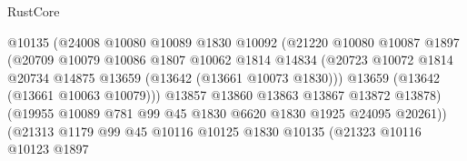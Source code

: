 \begin{lexlean}{RustCore}
\begin{coremodule}
                                    @10135
                                    (@24008
                                      @10080
                                      @10089
                                      @1830
                                      @10092
                                      (@21220
                                        @10080
                                        @10087
                                        @1897
                                        (@20709
                                          @10079
                                          @10086
                                          @1807
                                          @10062
                                          @1814
                                          @14834
                                          (@20723
                                            @10072
                                            @1814
                                            @20734
                                            @14875
                                            @13659
                                            (@13642 (@13661 @10073 @1830)))
                                          @13659
                                          (@13642 (@13661 @10063 @10079)))
                                        @13857
                                        @13860
                                        @13863
                                        @13867
                                        @13872
                                        @13878)
                                      (@19955
                                        @10089
                                        @781
                                        @99
                                        @45
                                        @1830
                                        @6620
                                        @1830
                                        @1925
                                        @24095
                                        @20261))
                                    (@21313
                                      @1179
                                      @99
                                      @45
                                      @10116
                                      @10125
                                      @1830
                                      @10135
                                      (@21323
                                        @10116
                                        @10123
                                        @1897

\end{coremodule}
\end{lexlean}
